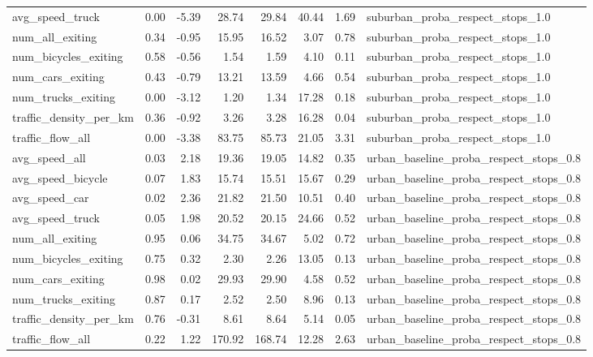 \begin{table}[ht]
\begin{tabular}{lrrrrrrl}
  avg\_speed\_truck & 0.00 & -5.39 & 28.74 & 29.84 & 40.44 & 1.69 & suburban\_proba\_respect\_stops\_1.0 \\ 
  num\_all\_exiting & 0.34 & -0.95 & 15.95 & 16.52 & 3.07 & 0.78 & suburban\_proba\_respect\_stops\_1.0 \\ 
  num\_bicycles\_exiting & 0.58 & -0.56 & 1.54 & 1.59 & 4.10 & 0.11 & suburban\_proba\_respect\_stops\_1.0 \\ 
  num\_cars\_exiting & 0.43 & -0.79 & 13.21 & 13.59 & 4.66 & 0.54 & suburban\_proba\_respect\_stops\_1.0 \\ 
  num\_trucks\_exiting & 0.00 & -3.12 & 1.20 & 1.34 & 17.28 & 0.18 & suburban\_proba\_respect\_stops\_1.0 \\ 
  traffic\_density\_per\_km & 0.36 & -0.92 & 3.26 & 3.28 & 16.28 & 0.04 & suburban\_proba\_respect\_stops\_1.0 \\ 
  traffic\_flow\_all & 0.00 & -3.38 & 83.75 & 85.73 & 21.05 & 3.31 & suburban\_proba\_respect\_stops\_1.0 \\ 
  avg\_speed\_all & 0.03 & 2.18 & 19.36 & 19.05 & 14.82 & 0.35 & urban\_baseline\_proba\_respect\_stops\_0.8 \\ 
  avg\_speed\_bicycle & 0.07 & 1.83 & 15.74 & 15.51 & 15.67 & 0.29 & urban\_baseline\_proba\_respect\_stops\_0.8 \\ 
  avg\_speed\_car & 0.02 & 2.36 & 21.82 & 21.50 & 10.51 & 0.40 & urban\_baseline\_proba\_respect\_stops\_0.8 \\ 
  avg\_speed\_truck & 0.05 & 1.98 & 20.52 & 20.15 & 24.66 & 0.52 & urban\_baseline\_proba\_respect\_stops\_0.8 \\ 
  num\_all\_exiting & 0.95 & 0.06 & 34.75 & 34.67 & 5.02 & 0.72 & urban\_baseline\_proba\_respect\_stops\_0.8 \\ 
  num\_bicycles\_exiting & 0.75 & 0.32 & 2.30 & 2.26 & 13.05 & 0.13 & urban\_baseline\_proba\_respect\_stops\_0.8 \\ 
  num\_cars\_exiting & 0.98 & 0.02 & 29.93 & 29.90 & 4.58 & 0.52 & urban\_baseline\_proba\_respect\_stops\_0.8 \\ 
  num\_trucks\_exiting & 0.87 & 0.17 & 2.52 & 2.50 & 8.96 & 0.13 & urban\_baseline\_proba\_respect\_stops\_0.8 \\ 
  traffic\_density\_per\_km & 0.76 & -0.31 & 8.61 & 8.64 & 5.14 & 0.05 & urban\_baseline\_proba\_respect\_stops\_0.8 \\ 
  traffic\_flow\_all & 0.22 & 1.22 & 170.92 & 168.74 & 12.28 & 2.63 & urban\_baseline\_proba\_respect\_stops\_0.8 \\ 

\end{tabular}
\end{table}
